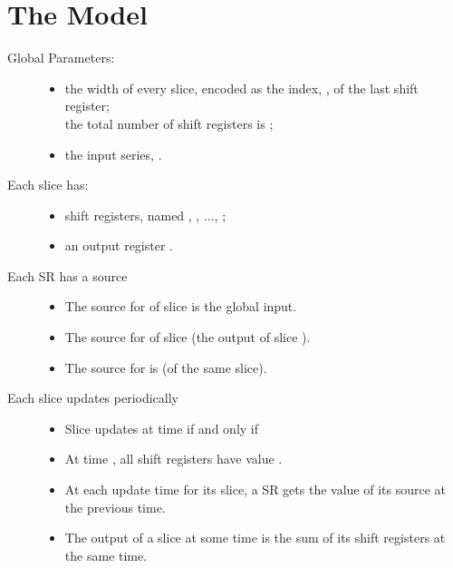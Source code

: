 \documentclass{article}
\begin{document}
\section*{The Model}
\begin{description}
\item[Global Parameters:]\hfill
\begin{itemize}
\item
     the width of every slice, encoded as the index, , of the last shift register;\\
     the total number of shift registers is ;
\item
     the input series, .
\end{itemize}
\item[Each slice has:]\hfill
\begin{itemize}
\item
      shift registers, named , , ..., ;
\item
     an output register .
\end{itemize}
\item[Each SR has a source]\hfill
\begin{itemize}
\item
     The source for  of slice  is the global input.
\item
     The source for  of slice  (the output of slice ).
\item
     The source for  is  (of the same slice).
\end{itemize}
\item[Each slice updates periodically]\hfill
\begin{itemize}
\item
     Slice  updates at time  if and only if 
\item
   At time , all shift registers have value .
\item
   At each update time for its slice, a SR gets the value of its source at the previous time.
\item
   The output of a slice at some time is the sum of its shift registers at the same time.
\end{itemize}
\end{description}
\end{document}
